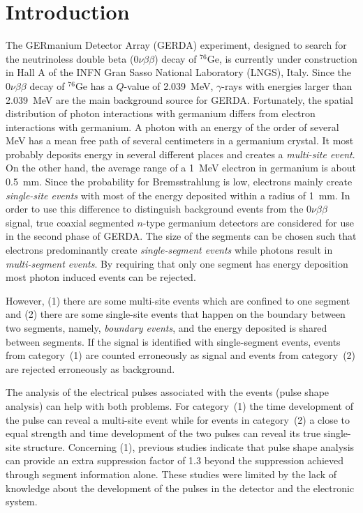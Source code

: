 \documentclass[epj]{svjour}
\begin{document}
\section{Introduction}
\label{s:intro}
The GERmanium Detector Array (GERDA) experiment, designed to search
for the neutrinoless double beta ($0\nu\beta\beta$) decay of
$^{76}$Ge, is currently under construction in Hall A of the INFN Gran
Sasso National Laboratory (LNGS), Italy. \cite{Abt04,Sch05} Since the
$0\nu\beta\beta$ decay of $^{76}$Ge has a $Q$-value of 2.039~MeV,
$\gamma$-rays with energies larger than 2.039~MeV are the main
background source for GERDA. Fortunately, the spatial distribution of
photon interactions with germanium differs from electron interactions
with germanium. A photon with an energy of the order of several MeV
has a mean free path of several centimeters in a germanium crystal. It
most probably deposits energy in several different places and creates
a \emph{multi-site event}. On the other hand, the average range of a
1~MeV electron in germanium is about 0.5~mm. Since the probability for
Bremsstrahlung is low, electrons mainly create \emph{single-site
events} with most of the energy deposited within a radius of 1~mm. In
order to use this difference to distinguish background events from the
$0\nu\beta\beta$ signal, true coaxial segmented $n$-type germanium
detectors are considered for use in the second phase of GERDA. The
size of the segments can be chosen such that electrons predominantly
create \emph{single-segment events} while photons result in
\emph{multi-segment events}. By requiring that only one segment has
energy deposition most photon induced events can be
rejected. \cite{photon}

However, (1) there are some multi-site events which are confined to
one segment and (2) there are some single-site events that happen on
the boundary between two segments, namely, \textit{boundary events},
and the energy deposited is shared between segments. If the signal is
identified with single-segment events, events from category~(1) are
counted erroneously as signal and events from category~(2) are
rejected erroneously as background.

The analysis of the electrical pulses associated with the events
(pulse shape analysis) can help with both problems. For category~(1)
the time development of the pulse can reveal a multi-site event while
for events in category~(2) a close to equal strength and time
development of the two pulses can reveal its true single-site
structure. Concerning (1), previous studies \cite{psa} indicate that
pulse shape analysis can provide an extra suppression factor of 1.3
beyond the suppression achieved through segment information
alone. These studies were limited by the lack of knowledge about the
development of the pulses in the detector and the electronic system.
\end{document}
